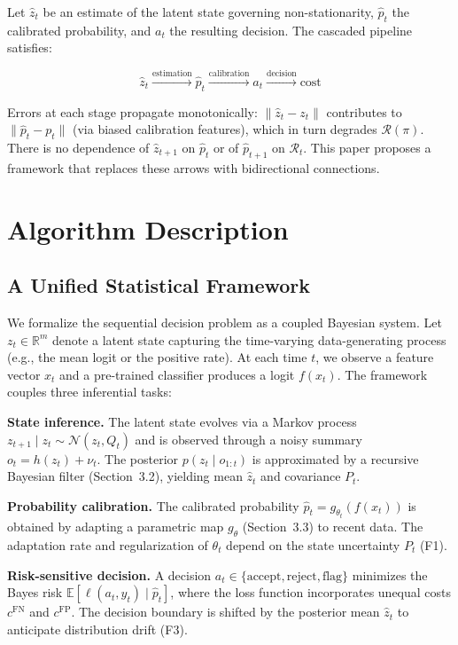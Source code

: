 \documentclass[12pt,a4paper]{article}
\begin{document}
Let $\hat{z}_t$ be an estimate of the latent state governing non-stationarity, $\hat{p}_t$ the calibrated probability, and $a_t$ the resulting decision. The cascaded pipeline satisfies:

\begin{equation}
    \hat{z}_t \xrightarrow{\text{estimation}} \hat{p}_t \xrightarrow{\text{calibration}} a_t \xrightarrow{\text{decision}} \text{cost}
\end{equation}

Errors at each stage propagate monotonically: $\|\hat{z}_t - z_t\|$ contributes to $\|\hat{p}_t - p_t\|$ (via biased calibration features), which in turn degrades $\mathcal{R}(\pi)$. There is no dependence of $\hat{z}_{t+1}$ on $\hat{p}_t$ or of $\hat{p}_{t+1}$ on $\mathcal{R}_t$. This paper proposes a framework that replaces these arrows with bidirectional connections.

\section{Algorithm Description}
\label{sec:method}

\subsection{A Unified Statistical Framework}

We formalize the sequential decision problem as a coupled Bayesian system. Let $z_t \in \mathbb{R}^m$ denote a latent state capturing the time-varying data-generating process (e.g., the mean logit or the positive rate). At each time $t$, we observe a feature vector $x_t$ and a pre-trained classifier produces a logit $f(x_t)$. The framework couples three inferential tasks:

\textbf{State inference.} The latent state evolves via a Markov process $z_{t+1} \mid z_t \sim \mathcal{N}(z_t, Q_t)$ and is observed through a noisy summary $o_t = h(z_t) + \nu_t$. The posterior $p(z_t \mid o_{1:t})$ is approximated by a recursive Bayesian filter (Section~3.2), yielding mean $\hat{z}_t$ and covariance $P_t$.

\textbf{Probability calibration.} The calibrated probability $\hat{p}_t = g_{\theta_t}(f(x_t))$ is obtained by adapting a parametric map $g_\theta$ (Section~3.3) to recent data. The adaptation rate and regularization of $\theta_t$ depend on the state uncertainty $P_t$ (F1).

\textbf{Risk-sensitive decision.} A decision $a_t \in \{\text{accept}, \text{reject}, \text{flag}\}$ minimizes the Bayes risk $\mathbb{E}[\ell(a_t, y_t) \mid \hat{p}_t]$, where the loss function incorporates unequal costs $c^{\text{FN}}$ and $c^{\text{FP}}$. The decision boundary is shifted by the posterior mean $\hat{z}_t$ to anticipate distribution drift (F3).
\end{document}
